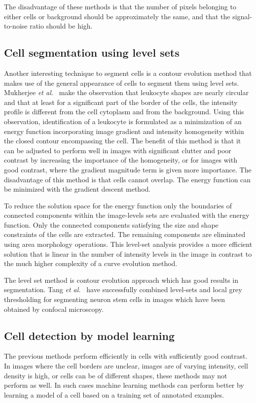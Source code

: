 The disadvantage of these methods is that the number of pixels belonging to either cells or background should be approximately the same, and that the signal-to-noise ratio should be high.

\subsection{Cell segmentation using level sets \statusfirstdraft}

Another interesting technique to segment cells is a contour evolution method that makes use of the general appearance of cells to segment them using level sets. Mukherjee \emph{et al.}~\cite{mukherjee04} make the observation that leukocyte shapes are nearly circular and that at least for a significant part of the border of the cells, the intensity profile is different from the cell cytoplasm and from the background. Using this observation, identification of a leukocyte is formulated as a minimization of an energy function incorporating image gradient and intensity homogeneity within the closed contour encompassing the cell. The benefit of this method is that it can be adjusted to perform well in images with significant clutter and poor contrast by increasing the importance of the homogeneity, or for images with good contrast, where the gradient magnitude term is given more importance. The disadvantage of this method is that cells cannot overlap. The energy function can be minimized with the gradient descent method.

To reduce the solution space for the energy function only the boundaries of connected components within the image-levels sets are evaluated with the energy function. Only the connected components satisfying the size and shape constraints of the cells are extracted. The remaining components are eliminated using area morphology operations. This level-set analysis provides a more efficient solution that is linear in the number of intensity levels in the image in contrast to the much higher complexity of a curve evolution method.

The level set method is contour evolution approach which has good results in segmentation. Tang \emph{et al.}~\cite{tang} have successfully combined level-sets and local grey thresholding \cite{xu10} for segmenting neuron stem cells in images which have been obtained by confocal microscopy.

\subsection{Cell detection by model learning \statusfirstdraft}
The previous methods perform efficiently in cells with sufficiently good contrast. In images where the cell borders are unclear, images are of varying intensity, cell density is high, or cells can be of different shapes, these methods may not perform as well. In such cases machine learning methods can perform better by learning a model of a cell based on a training set of annotated examples.

